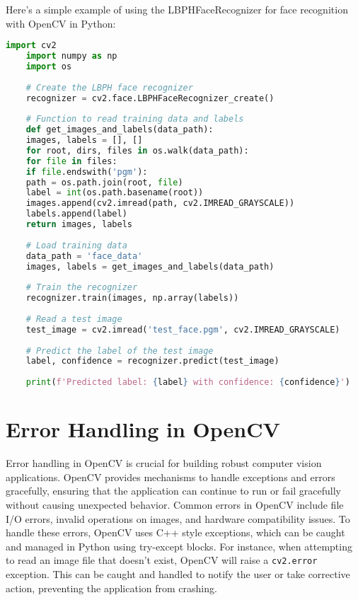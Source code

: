 Here's a simple example of using the LBPHFaceRecognizer for face recognition with OpenCV in Python:\cite{Jasmcaus:2024}

\begin{lstlisting}[language=Python, caption=LBPH Face Recognition]
	import cv2
	import numpy as np
	import os
	
	# Create the LBPH face recognizer
	recognizer = cv2.face.LBPHFaceRecognizer_create()
	
	# Function to read training data and labels
	def get_images_and_labels(data_path):
	images, labels = [], []
	for root, dirs, files in os.walk(data_path):
	for file in files:
	if file.endswith('pgm'):
	path = os.path.join(root, file)
	label = int(os.path.basename(root))
	images.append(cv2.imread(path, cv2.IMREAD_GRAYSCALE))
	labels.append(label)
	return images, labels
	
	# Load training data
	data_path = 'face_data'
	images, labels = get_images_and_labels(data_path)
	
	# Train the recognizer
	recognizer.train(images, np.array(labels))
	
	# Read a test image
	test_image = cv2.imread('test_face.pgm', cv2.IMREAD_GRAYSCALE)
	
	# Predict the label of the test image
	label, confidence = recognizer.predict(test_image)
	
	print(f'Predicted label: {label} with confidence: {confidence}')
\end{lstlisting}

\section{Error Handling in OpenCV}

Error handling in OpenCV is crucial for building robust computer vision applications. OpenCV provides mechanisms to handle exceptions and errors gracefully, ensuring that the application can continue to run or fail gracefully without causing unexpected behavior. Common errors in OpenCV include file I/O errors, invalid operations on images, and hardware compatibility issues. To handle these errors, OpenCV uses C++ style exceptions, which can be caught and managed in Python using try-except blocks. For instance, when attempting to read an image file that doesn't exist, OpenCV will raise a \texttt{cv2.error} exception. This can be caught and handled to notify the user or take corrective action, preventing the application from crashing.\cite{Jasmcaus:2024,OpenCVTeam:2024}

